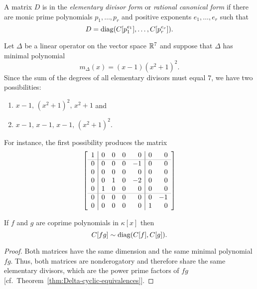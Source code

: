 \begin{defn}
     A matrix $D$ is in the \textsl{elementary divisor form} or \textsl{rational canonical form} if there are monic prime polynomials $p_1,\dots,p_r$ and positive exponents $e_1,\dots,e_r$ such that 
     $$
        D = \operatorname{diag}(C[p_1^{e_1}],\dots,C[p_r^{e_r}]).
     $$
\end{defn}

\begin{xmpl}
   Let\/ $\Delta$ be a linear operator on the vector space\/ $\mathbb{R}^7$ and suppose that\/ $\Delta$ has minimal polynomial
    $$
        m_\Delta(x) = (x - 1)(x^2 + 1)^2.
    $$
    Since the sum of the degrees of all elementary divisors must equal\/ $7$, we have two possibilities:
    \begin{enumerate}[\rm i)]
        \item $x-1, \, (x^2+1)^2,\, x^2+1$ and
        \item $x-1, \, x-1, \, x-1,\,(x^2+1)^2$.
    \end{enumerate}
    For instance, the first possibility produces the matrix
    $$
        \left[
            \begin{array}{r|rrrr|rr}
                1 & 0 & 0 & 0 & 0 & 0 & 0 \\
                \noalign{\color{gray}\hrule height 0.1mm}
                0 & 0 & 0 & 0 & -1 & 0 & 0 \\
                0 & 0 & 0 & 0 & 0 & 0 & 0 \\
                0 & 0 & 1 & 0 & -2 & 0 & 0 \\
                0 & 1 & 0 & 0 & 0 & 0 & 0 \\
                \noalign{\color{gray}\hrule height 0.1mm}
                0 & 0 & 0 & 0 & 0 & 0 & -1 \\
                0 & 0 & 0 & 0 & 0 & 1 & 0
            \end{array}
        \right]
    $$
\end{xmpl}

\begin{thm}\label{thm:companion-of-product}
    If $f$ and $g$ are coprime polynomials in $\kappa[x]$ then
    $$
        C[fg]\sim\operatorname{diag}(C[f],C[g]).
    $$
\end{thm}

\begin{proof}
    Both matrices have the same dimension and the same minimal polynomial $fg$. Thus, both matrices are nonderogatory and therefore share the same elementary divisors, which are the power prime factors of $fg$ [cf.~Theorem~\ref{thm:Delta-cyclic-equivalences}].
\end{proof}


